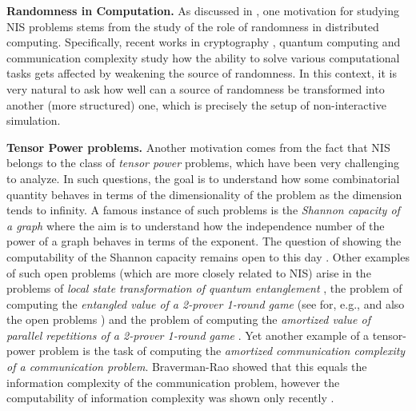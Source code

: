 \documentclass[11pt]{article}
\begin{document}
\textbf{Randomness in Computation.} As discussed in \cite{GKS_NIS_decidable}, one motivation for studying NIS problems stems from the study of the role of randomness in distributed computing. Specifically, recent works in
cryptography \cite{ahlswede1993common,ahlswede1998common,brassard1994secret,csiszar2000common,maurer1993secret, renner2005simple}, quantum computing \cite{nielsen1999conditions, chitambar2008tripartite, delgosha2014impossibility} and communication
complexity \cite{bavarian2014role,CGMS_ISR,ghazi2015communication} study how the ability to solve various computational tasks gets affected by weakening the source of randomness. In this context, it is very natural to ask how well can a source of randomness be transformed into another (more structured) one, which is precisely the setup of non-interactive simulation.

\textbf{Tensor Power problems.} Another motivation comes from the fact that NIS belongs to the class of {\em tensor power} problems, which have been very challenging to analyze. In such questions, the goal is to understand how some combinatorial quantity behaves in terms of the dimensionality of the problem as the dimension tends to infinity. A famous instance of such problems is the \emph{Shannon capacity of a graph} \cite{shannon1956zero,lovasz1979shannon} where the aim is to understand how the independence number of the power of a graph behaves in terms of the exponent. The question of showing the computability of the Shannon capacity remains open to this day \cite{alon2006shannon}. Other examples of such open problems (which are more closely related to NIS) arise in the problems of {\em local state transformation of quantum entanglement} \cite{Beigi_QuantumMaximalCorrelation, DelgoshaBeigi_QuantumHypercontractivity}, the problem of computing the {\em entangled value of a 2-prover 1-round game} (see for, e.g., \cite{KKMTV_HardnessApprox_EntangledGames} and also the open problems \cite{openQIwiki_all_bell_inequalities}) and the problem of computing the {\em amortized value of parallel repetitions of a 2-prover 1-round game} \cite{Raz_ParallelRep,Holenstein_ParallelRep,Rao_ParallelRep,Raz_CounterexampleStrongParallelRep,BHHRRS_RoundingParallelRepUG}. Yet another example of a tensor-power problem is the task of computing the {\em amortized communication complexity of a communication problem}. Braverman-Rao \cite{braverman2011information} showed that this equals the information complexity of the communication problem, however the computability of information complexity was shown only recently \cite{braverman2015information}.
\end{document}
